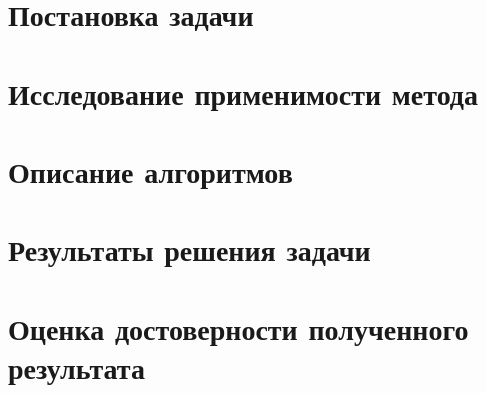 \documentclass[main.tex]{subfiles}
\begin{document}
\section{Постановка задачи}
\section{Исследование применимости метода}
\section{Описание алгоритмов}
\section{Результаты решения задачи}
\section{Оценка достоверности полученного результата}
\end{document}
